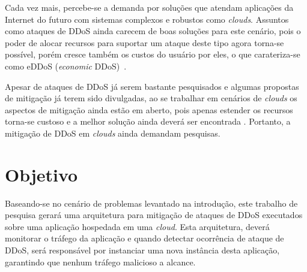 \documentclass[a4paper, 11pt]{article}
\begin{document}




Cada vez mais, percebe-se a demanda por solu\c{c}\~oes que atendam
aplica\c{c}\~oes da Internet do futuro com sistemas complexos e robustos como
\emph{clouds}. Assuntos como ataques de DDoS ainda carecem de boas
solu\c{c}\~oes para este cen\'ario, pois o poder de
alocar recursos para suportar um ataque deste tipo agora torna-se
poss\'ivel, por\'em cresce tamb\'em os custos do usu\'ario por eles, o que
carateriza-se como eDDoS (\emph{economic} DDoS)~\cite{Soon:10}.
  
Apesar de ataques de DDoS j\'a serem bastante pesquisados e algumas propostas
de mitiga\c{c}\~ao j\'a terem sido divulgadas, ao se trabalhar em cen\'arios de
\emph{clouds} os aspectos de mitiga\c{c}\~ao ainda est\~ao em aberto, pois
apenas estender os recursos  torna-se custoso e a melhor
solu\c{c}\~ao ainda dever\'a ser encontrada . Portanto, a mitiga\c{c}\~ao de
DDoS em \emph{clouds} ainda demandam pesquisas.



\section{Objetivo}
Baseando-se no cen\'ario de problemas levantado na introdu\c{c}\~{a}o, este
trabalho de pesquisa gerar\'a uma arquitetura para mitigação de ataques de
DDoS executados sobre uma aplicação hospedada em uma \emph{cloud}. Esta
arquitetura, dever\'a monitorar o tr\'afego da aplica\c{c}\~{a}o e quando
detectar
ocorrência de ataque de DDoS, ser\'a respons\'avel por instanciar uma nova
instância desta
aplica\c{c}\~{a}o, garantindo que nenhum tr\'afego malicioso a alcance.
\end{document}
